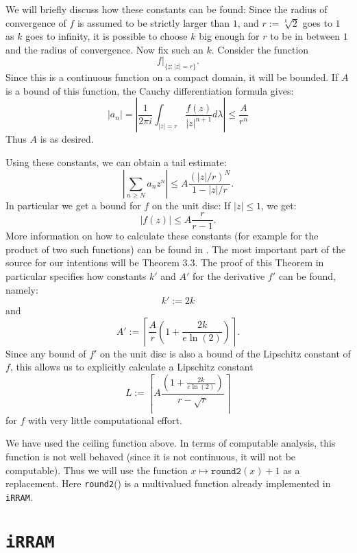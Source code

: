 \documentclass{article}
\newcommand{\irram}{\texttt{iRRAM}\xspace}
\newcommand{\ir}[1]{\texttt{#1}}
\begin{document}
We will briefly discuss how these constants can be found: Since the radius of convergence of $f$ is assumed to be strictly larger than $1$, and $r:=\sqrt[k] 2$ goes to $1$ as $k$ goes to infinity, it is possible to choose $k$ big enough for $r$ to be in between $1$ and the radius of convergence. Now fix such an $k$. Consider the function
\[ f|_{\{z:|z| = r\}}. \]
Since this is a continuous function on a compact domain, it will be bounded. If $A$ is a bound of this function, the Cauchy differentiation formula gives:
\[ |a_n |=  \left|\frac 1 {2\pi i}\int_{|z| = r} \frac{f(z)}{|z|^{n+1}} d\lambda\right| \leq \frac A {r^n} \]
Thus $A$ is as desired.

Using these constants, we can obtain a tail estimate:
\[ \left|\sum_{n \geq N} a_n z^n\right| \leq A \frac{(|z|/r)^N}{1- |z|/r}. \]
In particular we get a bound for $f$ on the unit disc: If $|z|\leq 1$, we get:
\[ |f(z)| \leq A\frac r{r-1}. \]
More information on how to calculate these constants (for example for the product of two such functions) can be found in \ref{}. The most important part of the source for our intentions will be Theorem 3.3. The proof of this Theorem in particular specifies how constants $k'$ and $A'$ for the derivative $f'$ can be found, namely:
\[ k' := 2 k \]
and
\[ A' := \left\lceil \frac{A}{r} \left(1+ \frac{2k}{e \ln(2)}\right)\right\rceil. \]
Since any bound of $f'$ on the unit disc is also a bound of the Lipschitz constant of $f$, this allows us to explicitly calculate a Lipschitz constant
\[ L := \left\lceil A \frac{\left(1 + \frac{2k}{e\ln(2)}\right)}{r-\sqrt{r}}\right\rceil \]
for $f$ with very little computational effort.

We have used the ceiling function above. In terms of computable analysis, this function is not well behaved (since it is not continuous, it will not be computable). Thus we will use the function $x \mapsto \ir{round2}(x) +1$ as a replacement. Here \ir{round2}() is a multivalued function already implemented in \irram.

\part{\irram}
\end{document}
